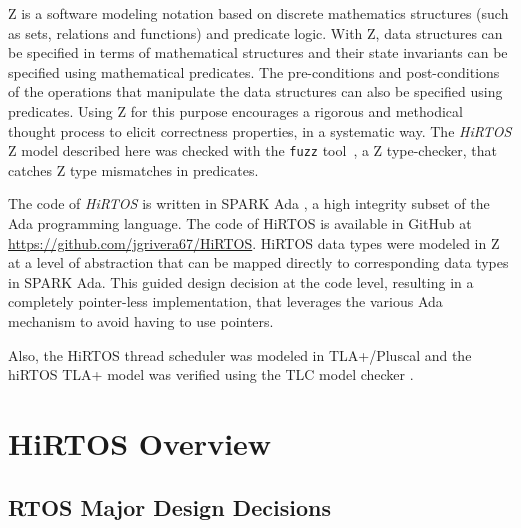 \documentclass[11pt,letterpaper,twoside,openany]{book}
\begin{document}
Z is a software modeling notation based on discrete mathematics structures (such as sets,
relations and functions) and predicate logic. With Z, data structures can be specified in
terms of mathematical structures and their state invariants can be specified using mathematical
predicates. The pre-conditions and post-conditions of the operations that manipulate
the data structures can also be specified using predicates. Using Z for this purpose encourages
a rigorous and methodical thought process to elicit correctness properties, in a systematic way.
The \emph{HiRTOS} Z model described here was checked with the \verb'fuzz' tool~\cite{Fuzz}, a
Z type-checker, that catches Z type mismatches in predicates.

The code of \emph{HiRTOS} is written in SPARK Ada \cite{SparkAda}, a high integrity
subset of the Ada programming language. The code of HiRTOS is available in GitHub at
\url{https://github.com/jgrivera67/HiRTOS}. HiRTOS data types were modeled in Z at a
level of abstraction that can be mapped directly to corresponding data types in SPARK Ada.
This guided design decision at the code level, resulting in a completely pointer-less
implementation, that leverages the various Ada mechanism to avoid having to use pointers.

Also, the HiRTOS thread scheduler was modeled in TLA+/Pluscal \cite{tla1, tla2} and the
hiRTOS TLA+ model was verified using the TLC model checker \cite{tlc}.

\chapter{HiRTOS Overview}

\section{RTOS Major Design Decisions}
\end{document}
